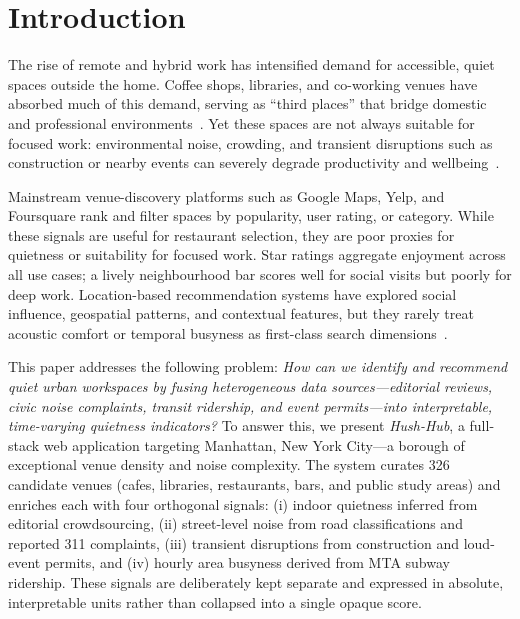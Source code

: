 \documentclass[conference]{IEEEtran}
\begin{document}
\section{Introduction}

The rise of remote and hybrid work has intensified demand for accessible, quiet spaces
outside the home. Coffee shops, libraries, and co-working venues have absorbed much of
this demand, serving as ``third places'' that bridge domestic and professional environments~\cite{akhavan2021}. Yet these spaces are not always suitable for focused work: environmental noise, crowding, and transient disruptions such as construction or nearby events can severely degrade productivity and wellbeing~\cite{who2018,murphy2014}.

Mainstream venue-discovery platforms such as Google Maps, Yelp, and Foursquare rank
and filter spaces by popularity, user rating, or category. While these signals are
useful for restaurant selection, they are poor proxies for quietness or suitability for
focused work. Star ratings aggregate enjoyment across all use cases; a lively
neighbourhood bar scores well for social visits but poorly for deep work. Location-based
recommendation systems have explored social influence, geospatial patterns, and
contextual features, but they rarely treat acoustic comfort or temporal busyness as
first-class search dimensions~\cite{bao2015,ye2012}.

This paper addresses the following problem: \textit{How can we identify and recommend
quiet urban workspaces by fusing heterogeneous data sources---editorial reviews, civic
noise complaints, transit ridership, and event permits---into interpretable,
time-varying quietness indicators?} To answer this, we present \textit{Hush-Hub}, a
full-stack web application targeting Manhattan, New York City---a borough of exceptional
venue density and noise complexity. The system curates 326 candidate venues (cafes,
libraries, restaurants, bars, and public study areas) and enriches each with four
orthogonal signals: (i) indoor quietness inferred from editorial crowdsourcing, (ii)
street-level noise from road classifications and reported 311 complaints, (iii)
transient disruptions from construction and loud-event permits, and (iv) hourly area
busyness derived from MTA subway ridership. These signals are deliberately kept
separate and expressed in absolute, interpretable units rather than collapsed into a
single opaque score.
\end{document}
